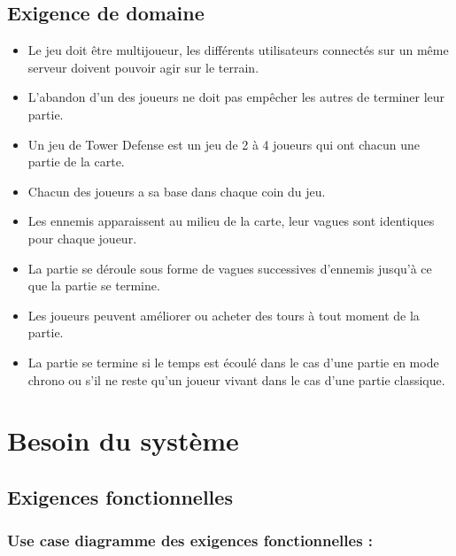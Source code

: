 \documentclass[10pt,a4paper]{article}
\begin{document}
\subsection{Exigence de domaine}

\begin{itemize}
	\item Le jeu doit être multijoueur, les différents \glspl{utilisateur} connectés sur un même \gls{serveur} doivent pouvoir agir sur le terrain.
   \item  L'abandon d'un des \glspl{joueur} ne doit pas empêcher les autres de terminer leur partie. 
   \item Un jeu de Tower Defense est un jeu de 2 à 4 \glspl{joueur} qui ont chacun une partie de la carte.
   \item Chacun des \glspl{joueur} a sa base dans chaque coin du jeu.
   \item Les ennemis apparaissent au milieu de la carte, leur vagues sont identiques pour chaque \gls{joueur}.
   \item La partie se déroule sous forme de vagues successives d’ennemis jusqu’à ce que la partie se termine.
   \item  Les \glspl{joueur} peuvent améliorer ou acheter des tours à tout moment de la partie.
   \item  La partie se termine si le temps est écoulé dans le cas d’une partie en mode chrono ou s’il ne reste qu’un \gls{joueur} vivant dans le cas d’une partie classique.
\end{itemize}
\newpage
\section{Besoin du système}
\subsection{Exigences fonctionnelles}
\subsubsection{Use case diagramme des exigences fonctionnelles :}
\end{document}
